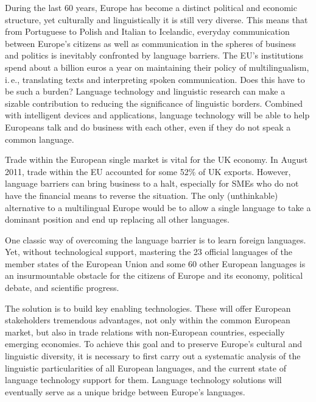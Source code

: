 \begin{multicols}{2}
  During the last 60 years, Europe has become a distinct political and economic structure, yet culturally and linguistically it is still very diverse. This means that from Portuguese to Polish and Italian to Icelandic, everyday communication between Europe’s citizens as well as communication in the spheres of business and politics is inevitably confronted by language barriers. The EU’s institutions spend about a billion euros a year on maintaining their policy of multilingualism, i.\,e., translating texts and interpreting spoken communication. Does this have to be such a burden? Language technology and linguistic research can make a sizable contribution to reducing the significance of linguistic borders. Combined with intelligent devices and applications, language technology will be able to help Europeans talk and do business with each other, even if they do not speak a common language.


Trade within the European single market is vital for the UK economy. In August 2011, trade within the EU accounted for some 52\% of UK exports. However, language barriers can bring business to a halt, especially for SMEs who do not have the financial means to reverse the situation. The only (unthinkable) alternative to a multilingual Europe would be to allow a single language to take a dominant position and end up replacing all other languages. 
    
One classic way of overcoming the language barrier is to learn foreign languages. Yet, without technological support, mastering the 23 official languages of the member states of the European Union and some 60 other European languages is an insurmountable obstacle for the citizens of Europe and its economy, political debate, and scientific progress.   
    
The solution is to build key enabling technologies. These will offer European stakeholders tremendous advantages, not only within the common European market, but also in trade relations with non-European countries, especially emerging economies.  To achieve this goal and to preserve Europe's cultural and linguistic diversity, it is necessary to first carry out a systematic analysis of the linguistic particularities of all European languages, and the current state of language technology support for them. Language technology solutions will eventually serve as a unique bridge between Europe's languages. 


\end{multicols}
